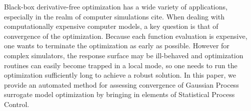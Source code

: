 \documentclass[12pt]{article}
\begin{document}

%
%

Black-box derivative-free optimization has a
wide variety of applications, especially in the realm of computer
simulations {\color{red}cite}.  
%
When dealing with computationally expensive computer
models, a key question is that of convergence of the optimization.
%
Because each function evaluation is expensive, one wants to terminate
the optimization as early as possible.  
%
However for complex simulators, the response surface may be ill-behaved and optimization
routines can easily become trapped in a local mode, so one needs to
run the optimization sufficiently long to achieve a robust solution.
%
In this paper, we provide an automated method for assessing convergence of 
Gaussian Process surrogate model optimization by bringing in elements
of Statistical Process Control.
\end{document}
